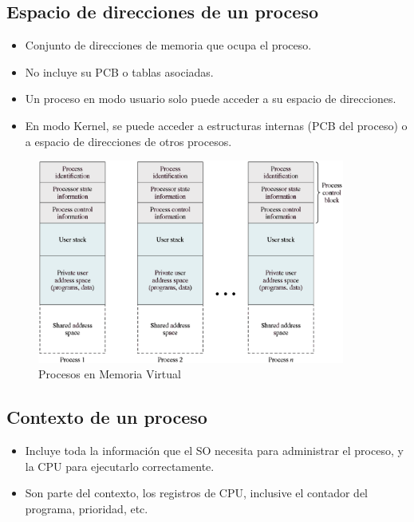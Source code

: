 \subsection{Espacio de direcciones de un proceso}
\begin{itemize}
    \item Conjunto de direcciones de memoria que ocupa el proceso.
    \item No incluye su PCB o tablas asociadas.
    \item Un proceso en modo usuario solo puede acceder a su espacio de direcciones.
    \item En modo Kernel, se puede acceder a estructuras internas (PCB del proceso) o a espacio de direcciones de otros procesos.
\end{itemize}
\begin{figure}[ht]
    \begin{center}
        \includegraphics[width=0.90\textwidth]{assets/Proceso.eps}
    \end{center}
    \caption{Procesos en Memoria Virtual}\label{fig:1}
\end{figure}
\pagebreak

\subsection{Contexto de un proceso}
\begin{itemize}
    \item Incluye toda la información que el SO necesita para administrar el proceso, y la CPU para ejecutarlo correctamente.
    \item Son parte del contexto, los registros de CPU, inclusive el contador del programa, prioridad, etc.
\end{itemize}
